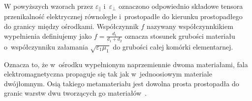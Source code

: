 W powyższych wzorach przez $\varepsilon_{\parallel}$ i~$\varepsilon_{\perp}$ oznaczono odpowiednio składowe tensora przenikalność elektrycznej równoległe i~prostopadłe do kierunku prostopadłego do granicy między ośrodkami. Współczynnik $f$ nazywany współczynnkikiem wypełnienia definiujemy jako $f=\frac{d_1}{d_1+d_2}$ oznacza stosunek grubości materiału o~współczynniku załamania $\sqrt{\varepsilon_1 \mu_1}$ do grubości całej komórki elementarnej.

Oznacza to, że w~ośrodku wypełnionym naprzemiennie dwoma materiałami, fala elektromagnetyczna propaguje się tak jak w~jednoosiowym materiale dwójłomnym. Osią takiego metamateriału jest dowolna prosta prostopadła do granic warstw dwu tworzących go materiałów~\cite{sihvola1999electromagnetic}.







